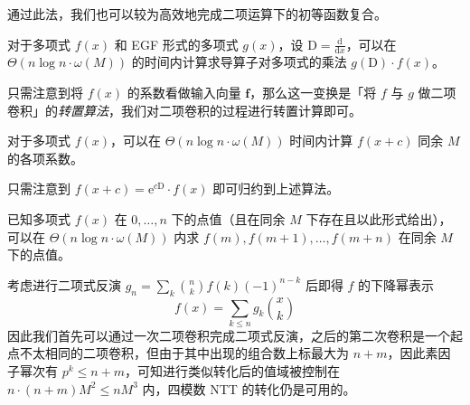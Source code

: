 通过此法，我们也可以较为高效地完成二项运算下的初等函数复合。

\begin{theorem}
对于多项式 $f(x)$ 和 EGF 形式的多项式 $g(x)$，设 $\mathrm{D} = \frac{\mathrm{d}}{\mathrm{d}x}$，可以在 $\Theta(n\log n \cdot \omega(M))$ 的时间内计算求导算子对多项式的乘法 $g(\mathrm{D}) \cdot f(x)$。
\end{theorem}

只需注意到将 $f(x)$ 的系数看做输入向量 $\mathbf f$，那么这一变换是「将 $f$ 与 $g$ 做二项卷积」的\emph{转置算法}，我们对二项卷积的过程进行转置计算即可。

\begin{lemma}
对于多项式 $f(x)$，可以在 $\Theta(n\log n \cdot \omega(M))$ 时间内计算 $f(x+c)$ 同余 $M$ 的各项系数。
\end{lemma}

只需注意到 $f(x+c) = \mathrm{e}^{c\mathrm{D}} \cdot f(x)$ 即可归约到上述算法。

\begin{lemma}
已知多项式 $f(x)$ 在 $0,\dots,n$ 下的点值（且在同余 $M$ 下存在且以此形式给出），可以在 $\Theta(n\log n \cdot \omega (M))$ 内求 $f(m),f(m+1),\dots,f(m+n)$ 在同余 $M$ 下的点值。
\end{lemma}

考虑进行二项式反演 $g_n = \sum_k \binom n k f(k)(-1)^{n-k}$ 后即得 $f$ 的下降幂表示
$$
f(x) = \sum_{k\le n} g_k \binom x k
$$
因此我们首先可以通过一次二项卷积完成二项式反演，之后的第二次卷积是一个起点不太相同的二项卷积，但由于其中出现的组合数上标最大为 $n+m$，因此素因子幂次有 $p^k\le n+m$，可知进行类似转化后的值域被控制在 $n\cdot (n+m)M^2\le nM^3$ 内，四模数 NTT 的转化仍是可用的。


